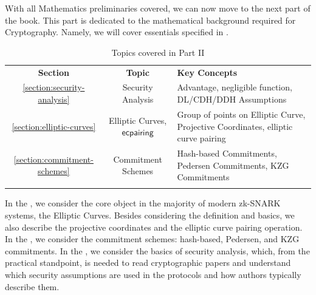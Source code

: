 \documentclass[../../../book]{subfiles}
\begin{document}
With all Mathematics preliminaries covered, we can now move to the next part of
the book. This part is dedicated to the mathematical background required for
Cryptography. Namely, we will cover essentials specified in .

\begin{table}[H]
    \centering
    \begin{tabularx}{\textwidth}{ccX}
        \Xhline{3\arrayrulewidth}
        \rowcolor{oc-green-3}\textbf{Section} & \textbf{Topic} & \textbf{Key Concepts} \\
        \Xhline{3\arrayrulewidth}
        \rowcolor{oc-green-1}\ref{section:security-analysis} & Security Analysis & Advantage, negligible function, DL/CDH/DDH Assumptions \\
        \hline
        \rowcolor{oc-green-2}\ref{section:elliptic-curves} & Elliptic Curves, $\mathsf{ecpairing}$ & Group of points on Elliptic Curve, Projective Coordinates, elliptic curve pairing \\
        \hline
        \rowcolor{oc-green-1}\ref{section:commitment-schemes} & Commitment Schemes &
        Hash-based Commitments, Pedersen Commitments, KZG Commitments \\
        \Xhline{3\arrayrulewidth}
    \end{tabularx}
    \caption{Topics covered in Part II}
    \label{tab:essentialls-2}
\end{table}

In the , we consider the core object in the
majority of modern zk-SNARK systems, the Elliptic Curves. Besides considering
the definition and basics, we also describe the projective coordinates and the
elliptic curve pairing operation. In the , we
consider the commitment schemes: hash-based, Pedersen, and KZG commitments. In
the , we consider the basics of security
analysis, which, from the practical standpoint, is needed to read 
cryptographic papers and understand which security assumptions are used in the
protocols and how authors typically describe them.
\end{document}
